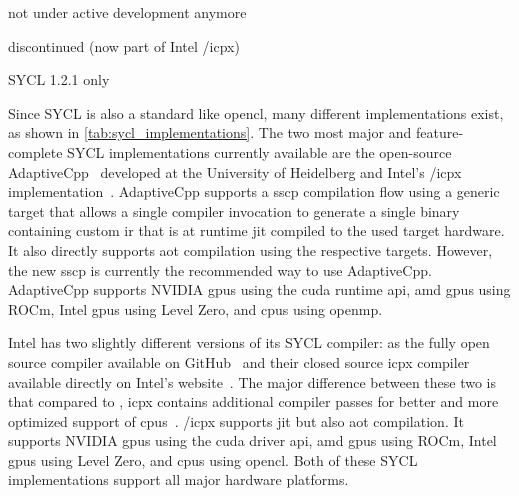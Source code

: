 \begin{table}[]
\begin{threeparttable}[b]
\begin{tblr}
        \end{tblr}
        \begin{tablenotes}
            \item[1] not under active development anymore
            \item[2] discontinued (now part of Intel \dpcpp/icpx)
            \item[*] SYCL 1.2.1 only
        \end{tablenotes}
    \end{threeparttable}
    \caption{%
        The available SYCL implementations. 
        Currently, three SYCL implementations are under active development, of which AdaptiveCpp and Intel's \dpcpp/icpx support the most hardware platforms. 
        The other SYCL implementations are not under active development anymore or have been officially discontinued (ComputeCpp). 
        Nevertheless, this table shows that SYCL supports a wide variety of different hardware platforms. 
    }
    \label{tab:sycl_implementations}
\end{table}

Since SYCL is also a standard like \gls{opencl}, many different implementations exist, as shown in \autoref{tab:sycl_implementations}. 
The two most major and feature-complete SYCL implementations currently available are the open-source AdaptiveCpp~\cite{alpay_sycl_2020, alpay_one_2023, alpay_adaptivecppadaptivecpp_2025} developed at the University of Heidelberg and Intel's \dpcpp/icpx implementation~\cite{reinders_data_2021}. 
AdaptiveCpp supports a \gls{sscp} compilation flow using a generic target that allows a single compiler invocation to generate a single binary containing custom \gls{ir} that is at runtime \gls{jit} compiled to the used target hardware. 
It also directly supports \gls{aot} compilation using the respective targets. 
However, the new \gls{sscp} is currently the recommended way to use AdaptiveCpp. 
AdaptiveCpp supports NVIDIA \glspl{gpu} using the \gls{cuda} runtime \gls{api}, \gls{amd} \glspl{gpu} using ROCm, Intel \glspl{gpu} using Level Zero, and \glspl{cpu} using \gls{openmp}. 

Intel has two slightly different versions of its SYCL compiler: \dpcpp as the fully open source compiler available on GitHub~\cite{noauthor_intelllvm_2025} and their closed source icpx compiler available directly on Intel's website~\cite{intel_compile_2025}. 
The major difference between these two is that compared to \dpcpp, icpx contains additional compiler passes for better and more optimized support of \glspl{cpu}~\cite{brodman_dpc_2023}.
\dpcpp/icpx supports \gls{jit} but also \gls{aot} compilation. 
It supports NVIDIA \glspl{gpu} using the \gls{cuda} driver \gls{api}, \gls{amd} \glspl{gpu} using ROCm, Intel \glspl{gpu} using Level Zero, and \glspl{cpu} using \gls{opencl}. 
Both of these SYCL implementations support all major hardware platforms. 

